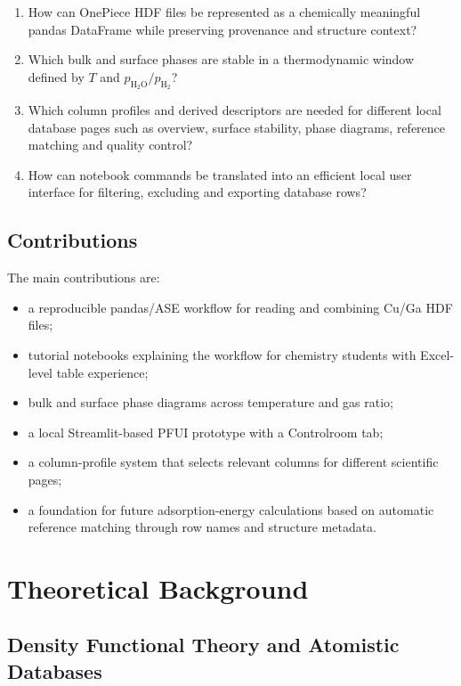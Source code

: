 \documentclass[12pt,a4paper,oneside]{report}
\begin{document}
\begin{enumerate}
  \item[\textbf{Q1.}] How can OnePiece HDF files be represented as a chemically meaningful
  pandas DataFrame while preserving provenance and structure context?
  \item[\textbf{Q2.}] Which bulk and surface phases are stable in a thermodynamic window
  defined by $T$ and $p_{\mathrm{H_2O}}/p_{\mathrm{H_2}}$?
  \item[\textbf{Q3.}] Which column profiles and derived descriptors are needed for different
  local database pages such as overview, surface stability, phase diagrams,
  reference matching and quality control?
  \item[\textbf{Q4.}] How can notebook commands be translated into an efficient local user
  interface for filtering, excluding and exporting database rows?
\end{enumerate}

\section{Contributions}

The main contributions are:

\begin{itemize}
  \item a reproducible pandas/ASE workflow for reading and combining Cu/Ga HDF
  files;
  \item tutorial notebooks explaining the workflow for chemistry students with
  Excel-level table experience;
  \item bulk and surface phase diagrams across temperature and gas ratio;
  \item a local Streamlit-based PFUI prototype with a Controlroom tab;
  \item a column-profile system that selects relevant columns for different
  scientific pages;
  \item a foundation for future adsorption-energy calculations based on
  automatic reference matching through row names and structure metadata.
\end{itemize}

\chapter{Theoretical Background}

\section{Density Functional Theory and Atomistic Databases}
\end{document}
